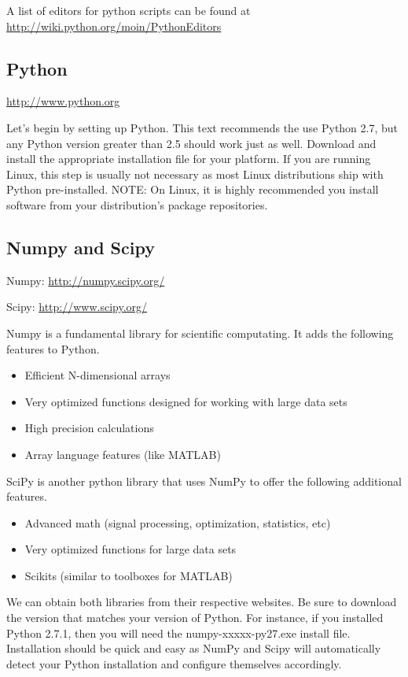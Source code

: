 \noindent A list of editors for python scripts can be found at \url{http://wiki.python.org/moin/PythonEditors}

\subsection*{Python}
\url{http://www.python.org}

Let's begin by setting up Python.  This text recommends the use Python 2.7, but any Python version greater than 2.5 should work just as well.  Download and install the appropriate installation file for your platform.  If you are running Linux, this step is usually not necessary as most Linux distributions ship with Python pre-installed.  NOTE: On Linux, it is highly recommended you install software from your distribution's package repositories.

\subsection*{Numpy and Scipy}
Numpy: \url{http://numpy.scipy.org/}

\noindent Scipy: \url{http://www.scipy.org/}

Numpy is a fundamental library for scientific computating.  It adds the following features to Python.
\begin{itemize}
\item Efficient N-dimensional arrays
\item Very optimized functions designed for working with large data sets
\item High precision calculations
\item Array language features (like MATLAB)
\end{itemize}

SciPy is another python library that uses NumPy to offer the following additional features.
\begin{itemize}
\item Advanced math (signal processing, optimization, statistics, etc)
\item Very optimized functions for large data sets
\item Scikits (similar to toolboxes for MATLAB)
\end{itemize}

We can obtain both libraries from their respective websites.  Be sure to download the version that matches your version of Python.  For instance, if you installed Python 2.7.1, then you will need the numpy-xxxxx-py27.exe install file.  Installation should be quick and easy as NumPy and Scipy will automatically detect your Python installation and configure themselves accordingly.

